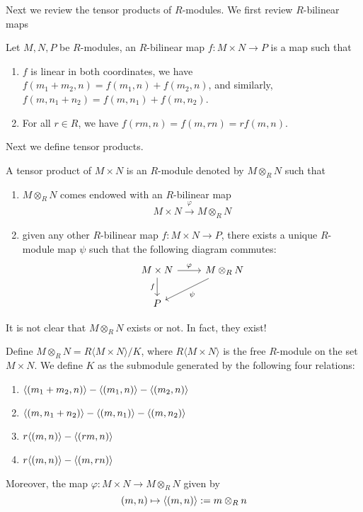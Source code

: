 Next we review the tensor products of $R$-modules. We first review $R$-bilinear maps 
\begin{defn}
    Let $M,N, P$ be $R$-modules, an $R$-bilinear map $f:M\times N\to P$ is a map such that 
    \begin{enumerate}
        \item $f$ is linear in both coordinates, we have $f(m_1+m_2,n)=f(m_1,n)+f(m_2,n)$, and similarly, $f(m,n_1+n_2)=f(m,n_1)+f(m,n_2)$.
        \item For all $r\in R$, we have $f(rm,n)=f(m,rn)=rf(m,n)$.
    \end{enumerate}
\end{defn}
Next we define tensor products.
\begin{defn}
    A tensor product of $M\times N$ is an $R$-module denoted by $M\otimes_R N$ such that 
    \begin{enumerate}
        \item $M\otimes_R N$ comes endowed with an $R$-bilinear map 
        \begin{equation*}
            M\times N\xrightarrow{\varphi}M\otimes_RN
        \end{equation*}
        \item given any other $R$-bilinear map $f: M\times N\to P$, there exists a unique $R$-module map $\psi$ such that the following diagram commutes:
        \[\begin{tikzcd}
            {M\times N} & {M\otimes_RN} \\
            P
            \arrow["\varphi", from=1-1, to=1-2]
            \arrow["f"', from=1-1, to=2-1]
            \arrow["\psi", from=1-2, to=2-1]
        \end{tikzcd}\]
    \end{enumerate}
\end{defn}
It is not clear that $M\otimes_RN$ exists or not. In fact, they exist!
\begin{thm}
    Define $M\otimes_RN=R\langle M\times N\rangle/K$, where $R\langle M\times N\rangle$ is the free $R$-module on the set $M\times N$. We define $K$ as the submodule generated by the following four relations:
    \begin{enumerate}
        \item $\langle(m_1+m_2,n)\rangle-\langle(m_1,n)\rangle-\langle(m_2,n)\rangle$
        \item $\langle(m,n_1+n_2)\rangle-\langle(m,n_1)\rangle-\langle(m,n_2)\rangle$
        \item $r\langle(m,n)\rangle-\langle(rm,n)\rangle$
        \item $r\langle(m,n)\rangle-\langle(m,rn)\rangle$
    \end{enumerate}
    Moreover, the map $\varphi:M\times N\to M\otimes_RN$ given by 
    \begin{equation*}
        (m,n)\mapsto \langle(m,n)\rangle:=m\otimes_Rn
    \end{equation*}
\end{thm}

